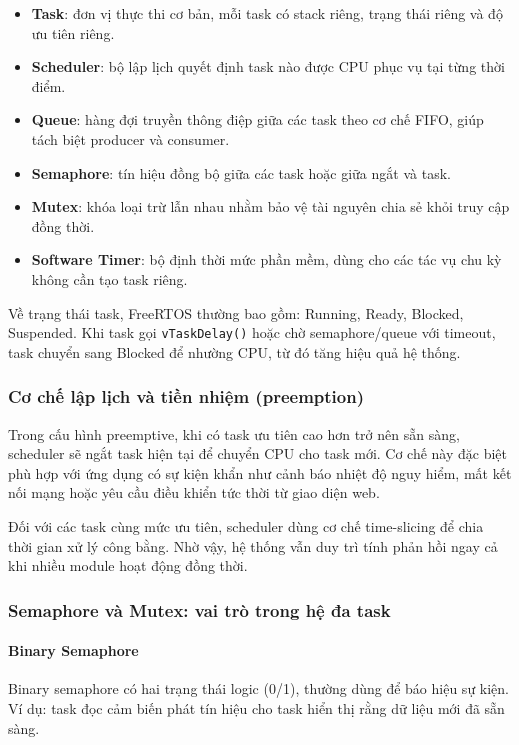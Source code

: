 \begin{itemize}
    \item \textbf{Task}: đơn vị thực thi cơ bản, mỗi task có stack riêng, trạng thái riêng và độ ưu tiên riêng.
    \item \textbf{Scheduler}: bộ lập lịch quyết định task nào được CPU phục vụ tại từng thời điểm.
    \item \textbf{Queue}: hàng đợi truyền thông điệp giữa các task theo cơ chế FIFO, giúp tách biệt producer và consumer.
    \item \textbf{Semaphore}: tín hiệu đồng bộ giữa các task hoặc giữa ngắt và task.
    \item \textbf{Mutex}: khóa loại trừ lẫn nhau nhằm bảo vệ tài nguyên chia sẻ khỏi truy cập đồng thời.
    \item \textbf{Software Timer}: bộ định thời mức phần mềm, dùng cho các tác vụ chu kỳ không cần tạo task riêng.
\end{itemize}

Về trạng thái task, FreeRTOS thường bao gồm: Running, Ready, Blocked, Suspended. Khi task gọi \texttt{vTaskDelay()} hoặc chờ semaphore/queue với timeout, task chuyển sang Blocked để nhường CPU, từ đó tăng hiệu quả hệ thống.

\subsubsection*{Cơ chế lập lịch và tiền nhiệm (preemption)}

Trong cấu hình preemptive, khi có task ưu tiên cao hơn trở nên sẵn sàng, scheduler sẽ ngắt task hiện tại để chuyển CPU cho task mới. Cơ chế này đặc biệt phù hợp với ứng dụng có sự kiện khẩn như cảnh báo nhiệt độ nguy hiểm, mất kết nối mạng hoặc yêu cầu điều khiển tức thời từ giao diện web.

Đối với các task cùng mức ưu tiên, scheduler dùng cơ chế time-slicing để chia thời gian xử lý công bằng. Nhờ vậy, hệ thống vẫn duy trì tính phản hồi ngay cả khi nhiều module hoạt động đồng thời.

\subsubsection*{Semaphore và Mutex: vai trò trong hệ đa task}

\paragraph{Binary Semaphore}
Binary semaphore có hai trạng thái logic (0/1), thường dùng để báo hiệu sự kiện. Ví dụ: task đọc cảm biến phát tín hiệu cho task hiển thị rằng dữ liệu mới đã sẵn sàng.

